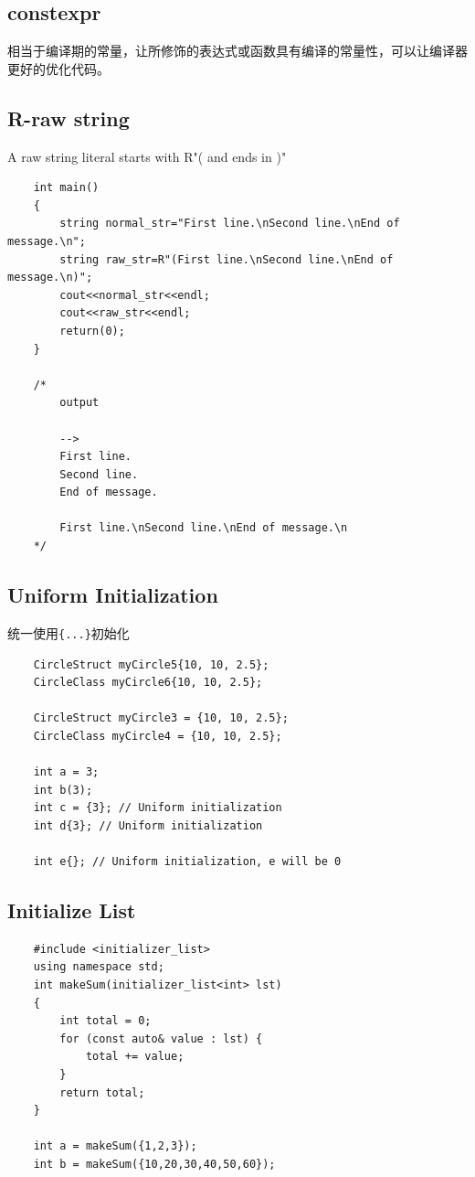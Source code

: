 \documentclass[UTF8,a4paper,12pt]{ctexbook} %
\begin{document}
		\subsection{constexpr}
			相当于编译期的常量，让所修饰的表达式或函数具有编译的常量性，可以让编译器更好的优化代码。
		
		\subsection{R-raw string}
			A raw string literal starts with R"( and ends in )"
				\begin{lstlisting}
	int main()
	{
		string normal_str="First line.\nSecond line.\nEnd of message.\n";
		string raw_str=R"(First line.\nSecond line.\nEnd of message.\n)";
		cout<<normal_str<<endl;
		cout<<raw_str<<endl;
		return(0);
	}
	
	/*
		output
		
		-->
		First line.
		Second line.
		End of message.
		
		First line.\nSecond line.\nEnd of message.\n
	*/				
				\end{lstlisting}
		\subsection{Uniform Initialization} 统一使用\verb|{...}|初始化
			\begin{lstlisting}
	CircleStruct myCircle5{10, 10, 2.5};
	CircleClass myCircle6{10, 10, 2.5};
	
	CircleStruct myCircle3 = {10, 10, 2.5};
	CircleClass myCircle4 = {10, 10, 2.5};
	
	int a = 3;
	int b(3);
	int c = {3}; // Uniform initialization
	int d{3}; // Uniform initialization
	
	int e{}; // Uniform initialization, e will be 0
			\end{lstlisting}
			
		\subsection{Initialize List}
			\begin{lstlisting}
	#include <initializer_list>
	using namespace std;
	int makeSum(initializer_list<int> lst)
	{
		int total = 0;
		for (const auto& value : lst) {
			total += value;
		}
		return total;
	}
	
	int a = makeSum({1,2,3});
	int b = makeSum({10,20,30,40,50,60});
			\end{lstlisting}
\end{document}
